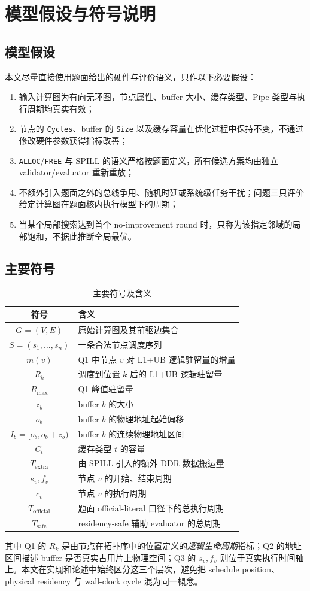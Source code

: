 \section{模型假设与符号说明}

\subsection{模型假设}

本文尽量直接使用题面给出的硬件与评价语义，只作以下必要假设：
\begin{enumerate}[label=(\arabic*)]
    \item 输入计算图为有向无环图，节点属性、buffer 大小、缓存类型、Pipe 类型与执行周期均真实有效；
    \item 节点的 \texttt{Cycles}、buffer 的 \texttt{Size} 以及缓存容量在优化过程中保持不变，不通过修改硬件参数获得指标改善；
    \item \texttt{ALLOC}/\texttt{FREE} 与 SPILL 的语义严格按题面定义，所有候选方案均由独立 validator/evaluator 重新重放；
    \item 不额外引入题面之外的总线争用、随机时延或系统级任务干扰；问题三只评价给定计算图在题面核内执行模型下的周期；
    \item 当某个局部搜索达到首个 no-improvement round 时，只称为该指定邻域的局部饱和，不据此推断全局最优。
\end{enumerate}

\subsection{主要符号}

\begin{table}[H]
\centering
\caption{主要符号及含义}
\label{tab:symbols}
\begin{tabular}{cl}
\toprule
符号 & 含义 \\
\midrule
$G=(V,E)$ & 原始计算图及其前驱边集合 \\
$S=(s_1,\ldots,s_n)$ & 一条合法节点调度序列 \\
$m(v)$ & Q1 中节点 $v$ 对 L1+UB 逻辑驻留量的增量 \\
$R_k$ & 调度到位置 $k$ 后的 L1+UB 逻辑驻留量 \\
$R_{\max}$ & Q1 峰值驻留量 \\
$z_b$ & buffer $b$ 的大小 \\
$o_b$ & buffer $b$ 的物理地址起始偏移 \\
$I_b=[o_b,o_b+z_b)$ & buffer $b$ 的连续物理地址区间 \\
$C_t$ & 缓存类型 $t$ 的容量 \\
$T_{\mathrm{extra}}$ & 由 SPILL 引入的额外 DDR 数据搬运量 \\
$s_v,f_v$ & 节点 $v$ 的开始、结束周期 \\
$c_v$ & 节点 $v$ 的执行周期 \\
$T_{\mathrm{official}}$ & 题面 official-literal 口径下的总执行周期 \\
$T_{\mathrm{safe}}$ & residency-safe 辅助 evaluator 的总周期 \\
\bottomrule
\end{tabular}
\end{table}

其中 Q1 的 $R_k$ 是由节点在拓扑序中的位置定义的\emph{逻辑生命周期}指标；Q2 的地址区间描述 buffer 是否真实占用片上物理空间；Q3 的 $s_v,f_v$ 则位于真实执行时间轴上。本文在实现和论述中始终区分这三个层次，避免把 schedule position、physical residency 与 wall-clock cycle 混为同一概念。